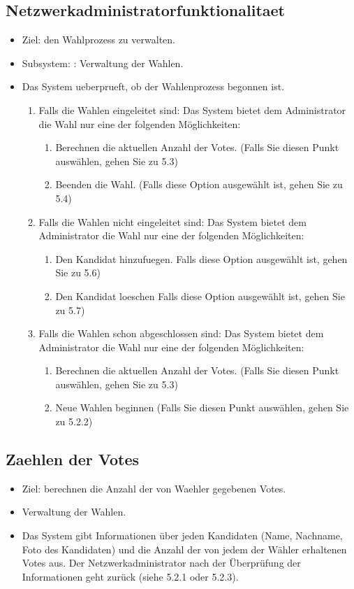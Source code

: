 \documentclass[parskip=full,11pt,twoside]{scrartcl}
\begin{document}
\subsection{Netzwerkadministratorfunktionalitaet}
\begin{itemize}
	\item Ziel: den Wahlprozess zu verwalten.
	\item Subsystem: : Verwaltung der Wahlen.
	\item Das System ueberprueft, ob der Wahlenprozess begonnen ist.	
	\begin{enumerate}
		\item Falls die Wahlen eingeleitet sind: Das System bietet dem Administrator die Wahl nur eine  der   folgenden Möglichkeiten:
		\begin{enumerate}
			\item Berechnen die aktuellen Anzahl der Votes. (Falls Sie diesen Punkt auswählen, gehen Sie zu 5.3)
			\item Beenden die Wahl. (Falls diese Option ausgewählt ist, gehen Sie zu 5.4)
		\end{enumerate}
		\item Falls die Wahlen nicht eingeleitet sind: Das System bietet dem Administrator die Wahl nur eine  der   folgenden Möglichkeiten:
		\begin{enumerate}
			\item Den Kandidat hinzufuegen. Falls diese Option ausgewählt ist, gehen Sie zu 5.6)
			\item Den Kandidat loeschen Falls diese Option ausgewählt ist, gehen Sie zu 5.7)
		\end{enumerate}
		\item Falls die Wahlen schon abgeschlossen sind: Das System bietet dem Administrator die Wahl nur eine  der   folgenden Möglichkeiten:
		\begin{enumerate}
			\item Berechnen die aktuellen Anzahl der Votes. (Falls Sie diesen Punkt auswählen, gehen Sie zu 5.3)
			\item Neue Wahlen beginnen (Falls Sie diesen Punkt auswählen, gehen Sie zu 5.2.2)
		\end{enumerate}
	\end{enumerate}
\end{itemize}

\subsection{Zaehlen der Votes}	
\begin{itemize}
	\item Ziel: berechnen die Anzahl der von Waehler gegebenen Votes.
	\item Verwaltung der Wahlen.
	\item Das System gibt Informationen über jeden Kandidaten (Name, Nachname, Foto des Kandidaten) und die Anzahl der von jedem der Wähler erhaltenen Votes aus. Der Netzwerkadministrator nach der Überprüfung der Informationen geht zurück (siehe 5.2.1 oder 5.2.3). 
\end{itemize}
\end{document}
